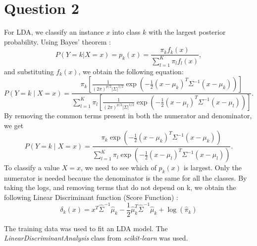 \section*{Question 2}

For LDA, we classify an instance $x$ into class $k$ with the largest
posterior probability. Using Bayes' theorem \parencite{gareth2023introduction}:
\[P(Y = k | X = x) = p_k(x) =  \frac{\pi_k f_k(x)}{\sum_{l = 1}^{K} \pi_l f_l(x)},\]
and substituting $f_k(x)$, we obtain the following equation:
\[
P(Y=k\mid X=x)
=
\frac{
\pi_k
\left[
\frac{1}{(2\pi)^{p/2}|\Sigma|^{1/2}}
\exp\left(
-\frac{1}{2}
(x-\mu_k)^T
\Sigma^{-1}
(x-\mu_k)
\right)
\right]
}
{
\sum_{l=1}^{K}
\pi_l
\left[
\frac{1}{(2\pi)^{p/2}|\Sigma|^{1/2}}
\exp\left(
-\frac{1}{2}
(x-\mu_l)^T
\Sigma^{-1}
(x-\mu_l)
\right)
\right]
}.
\]
By removing the common terms present in both the numerator and denominator, we get
\[
P(Y=k\mid X=x)
=
\frac{
\pi_k
\exp\left(
-\frac{1}{2}
(x-\mu_k)^T
\Sigma^{-1}
(x-\mu_k)
\right)
}
{
\sum_{l=1}^{K}
\pi_l
\exp\left(
-\frac{1}{2}
(x-\mu_l)^T
\Sigma^{-1}
(x-\mu_l)
\right)
}.
\]
To classify a value $X = x$, we need to see which of $p_k(x)$ is largest. Only the numerator is
needed because the denominator is the same for all the classes. By taking the logs,
and removing terms that do not depend on k, we obtain the following Linear Discriminant function
(Score Function) \parencite{gareth2023introduction}:
\[\delta_k(x) = x^T\hat{\Sigma}^{-1}\hat{\mu}_k - \frac{1}{2}\hat{\mu}_k^T\hat{\Sigma}^{-1}\hat{\mu}_k + \log(\hat{\pi}_k)\]

The training data was used to fit an LDA model. The \emph{LinearDiscriminantAnalysis}
class from \emph{scikit-learn} was used.

